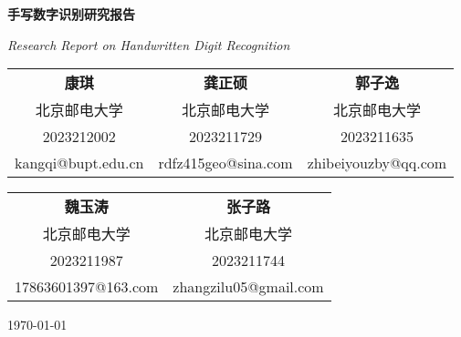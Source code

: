 
\begin{titlepage}
    \centering
    \vspace*{2.5cm}

    {\LARGE\bfseries 手写数字识别研究报告 \par}
    \vspace{0.8cm}
    {\large\itshape Research Report on Handwritten Digit Recognition \par}

    \vspace{2.5cm}

    \begin{center}
    \begin{tabular}{ccc}
        \textbf{康琪} & \textbf{龚正硕} & \textbf{郭子逸} \\
        北京邮电大学 & 北京邮电大学 & 北京邮电大学 \\
        2023212002 &2023211729 & 2023211635 \\
        kangqi@bupt.edu.cn & rdfz415geo@sina.com & zhibeiyouzby@qq.com \\
    \end{tabular}

    \vspace{1.2cm}

    \begin{tabular}{cc}
        \textbf{魏玉涛} & \textbf{张子路} \\
                北京邮电大学 & 北京邮电大学 \\
        2023211987 & 2023211744 \\
        17863601397@163.com & zhangzilu05@gmail.com \\
    \end{tabular}
    \end{center}

    \vfill

    {\normalsize\today\par}
\end{titlepage}